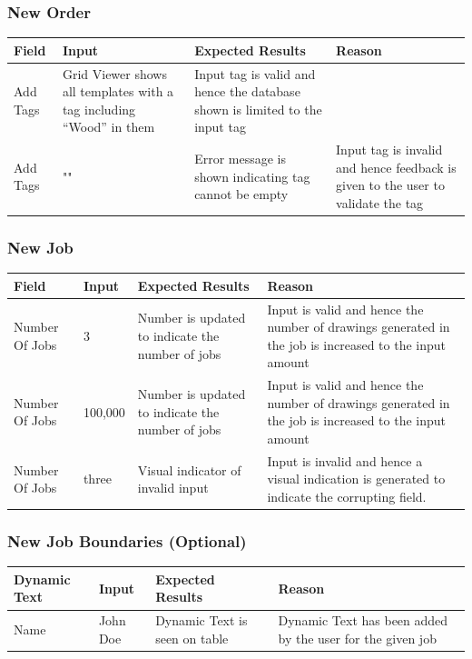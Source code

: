 \documentclass[oneside,openany,11pt,a4paper]{report}
\begin{document}
\subsubsection{New Order}
\begin{longtable}{|p{3cm}|p{3cm}|p{4.5cm}|p{4.5cm}|}
	\hline
	\rowcolor{gray!50}
	\textbf{Field} & \textbf{Input} &  \textbf{Expected Results} & \textbf{Reason} \\ \hline
	
	Add Tags & Grid Viewer shows all templates with a tag including “Wood” in them & Input tag is valid and hence the database shown is limited to the input tag \\ \hline
	
	Add Tags & "" & Error message is shown indicating tag cannot be empty & Input tag is invalid and hence feedback is given to the user to validate the tag \\ \hline
	
\end{longtable}

\subsubsection{New Job}
\begin{longtable}{|p{3cm}|p{3cm}|p{4.5cm}|p{4.5cm}|}
	\hline
	\rowcolor{gray!50}
	\textbf{Field} & \textbf{Input} &  \textbf{Expected Results} & \textbf{Reason} \\ \hline
	
	Number Of Jobs & 3 & Number is updated to indicate the number of jobs & Input is valid and hence the number of drawings generated in the job is increased to the input amount \\ \hline
	
	Number Of Jobs & 100,000 & Number is updated to indicate the number of jobs & Input is valid and hence the number of drawings generated in the job is increased to the input amount \\ \hline
	
	Number Of Jobs & three & Visual indicator of invalid input & Input is invalid and hence a visual indication is generated to indicate the corrupting field. \\ \hline
	
\end{longtable}

\subsubsection{New Job Boundaries (Optional)}
\begin{longtable}{|p{3cm}|p{3cm}|p{4.5cm}|p{4.5cm}|}
	\hline
	\rowcolor{gray!50}
	\textbf{Dynamic Text} & \textbf{Input} &  \textbf{Expected Results} & \textbf{Reason} \\ \hline
	
	Name & John Doe &Dynamic Text is seen on table & Dynamic Text has been added by the user for the given job \\ \hline
	
\end{longtable}
\end{document}
